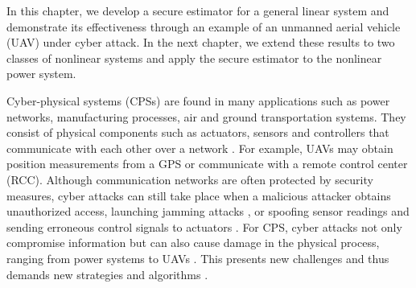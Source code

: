 \documentclass[../../thesis.tex]{subfiles}
\begin{document}

In this chapter, we develop a secure estimator for a general linear system and demonstrate its effectiveness through an example of an unmanned aerial vehicle (UAV) under cyber attack.
In the next chapter, we extend these results to two classes of nonlinear systems and apply the secure estimator to the nonlinear power system.

Cyber-physical systems (CPSs) are found in many applications such as power networks, manufacturing processes, air and ground transportation systems. They consist of physical components such as actuators, sensors and controllers that communicate with each other over a network \cite{kim2012cyber}. 
For example, UAVs may obtain position measurements from a GPS or communicate with a remote control center (RCC). Although communication networks are often protected by security measures, cyber attacks can still take place when a malicious attacker obtains unauthorized access, launching jamming attacks \cite{Gligor}, or spoofing sensor readings and sending erroneous control signals to actuators \cite{Mo}. For CPS, cyber attacks not only compromise information but can also cause damage in the physical process, ranging from power systems \cite{teixeira2010cyber, liu2011false} to UAVs \cite{Hu:2016uav}. This presents new challenges and thus demands new strategies and algorithms \cite{Sastry}.
\end{document}
